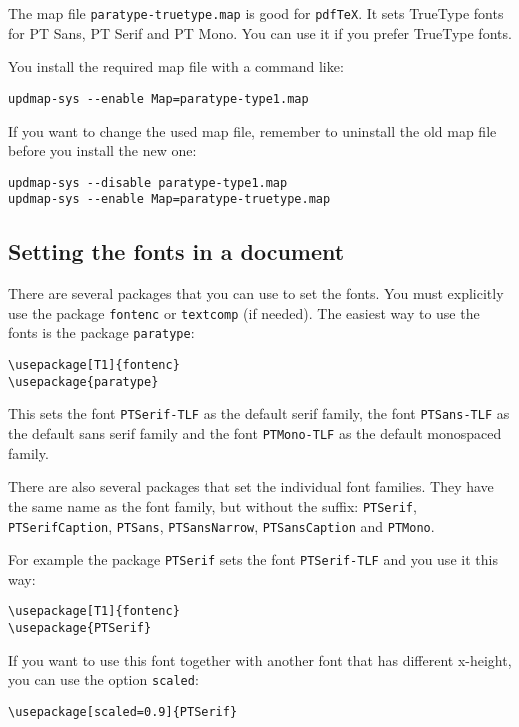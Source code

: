 \documentclass[oneside]{scrartcl}
\newcommand{\code}{\texttt}
\newcommand{\program}{\texttt}
\begin{document}
The map file \code{paratype-truetype.map} is good for \program{pdf\TeX}. It sets
TrueType fonts for PT Sans, PT Serif and PT Mono. You can use it if you prefer
TrueType fonts.

You install the required map file with a command like:
\begin{verbatim}
updmap-sys --enable Map=paratype-type1.map
\end{verbatim}

If you want to change the used map file, remember to uninstall the old map file
before you install the new one:
\begin{verbatim}
updmap-sys --disable paratype-type1.map
updmap-sys --enable Map=paratype-truetype.map
\end{verbatim}


\subsection{Setting the fonts in a document}

There are several packages that you can use to set the fonts. You
must explicitly use the package \code{fontenc} or \code{textcomp} (if
needed). The easiest way to use the fonts is the package \code{paratype}:
\begin{verbatim}
\usepackage[T1]{fontenc}
\usepackage{paratype}
\end{verbatim}

This sets the font \code{PTSerif-TLF} as the default serif family,
the font \code{PTSans-TLF} as the default sans serif family and the
font \code{PTMono-TLF} as the default monospaced family.

There are also several packages that set the individual font families.
They have the same name as the font family, but without the suffix:
\code{PTSerif}, \code{PTSerifCaption},
\code{PTSans}, \code{PTSansNarrow}, \code{PTSansCaption}
and \code{PTMono}.

For example the package \code{PTSerif} sets the font \code{PTSerif-TLF}
and you use it this way:
\begin{verbatim}
\usepackage[T1]{fontenc}
\usepackage{PTSerif}
\end{verbatim}


If you want to use this font together with another font that has different
x-height, you can use the option \code{scaled}:
\begin{verbatim}
\usepackage[scaled=0.9]{PTSerif}
\end{verbatim}
\end{document}
